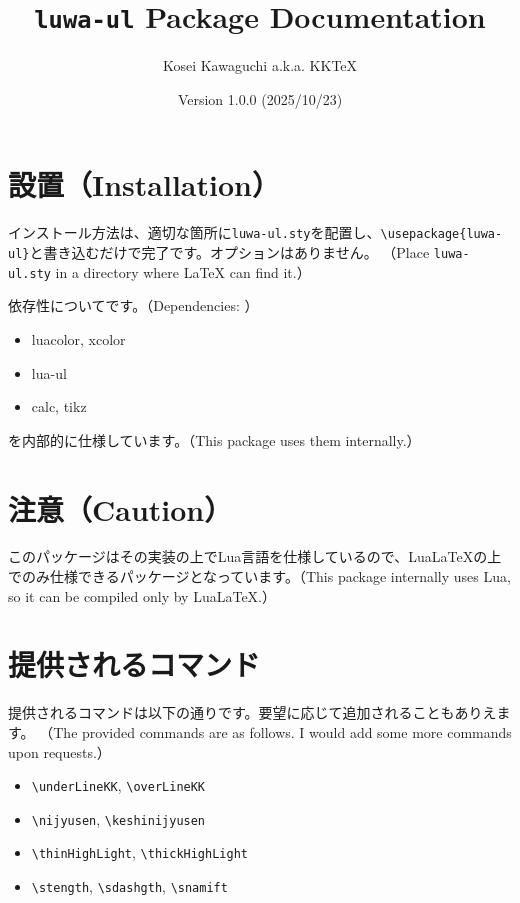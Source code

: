 \documentclass[luatex,fontsize=8pt,paper=b5,twoside]{jlreq}%
\title{\texttt{luwa-ul} Package Documentation}
\author{Kosei Kawaguchi a.k.a. KKTeX}
\date{Version 1.0.0 (2025/10/23)}
\begin{document}
\begin{titlepage}
  \maketitle
\end{titlepage}
\newpage
\tableofcontents
\newpage

\section{設置（Installation）}
インストール方法は、適切な箇所に\texttt{luwa-ul.sty}を配置し、\verb|\usepackage{luwa-ul}|と書き込むだけで完了です。オプションはありません。
（Place \texttt{luwa-ul.sty} in a directory where LaTeX can find it.）

依存性についてです。（Dependencies: ）

\begin{itemize}
  \item luacolor, xcolor
  \item lua-ul
  \item calc, tikz
\end{itemize}

\noindent を内部的に仕様しています。（This package uses them internally.）

\section{注意（Caution）}
このパッケージはその実装の上でLua言語を仕様しているので、LuaLaTeXの上でのみ仕様できるパッケージとなっています。（This package internally uses Lua, so it can be compiled only by LuaLaTeX.）

\section{提供されるコマンド}
提供されるコマンドは以下の通りです。要望に応じて追加されることもありえます。
（The provided commands are as follows. I would add some more commands upon requests.）

\begin{itemize}
  \item \verb|\underLineKK|, \verb|\overLineKK|
  \item \verb|\nijyusen|, \verb|\keshinijyusen|
  \item \verb|\thinHighLight|, \verb|\thickHighLight|
  \item \verb|\stength|, \verb|\sdashgth|, \verb|\snamift|
\end{itemize}
\end{document}

